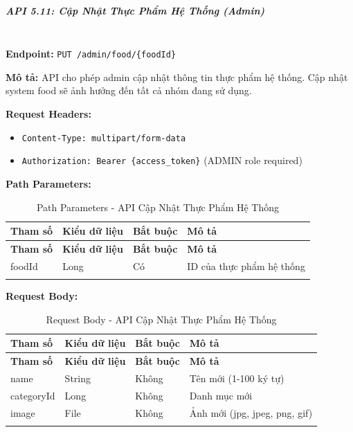 \normalsize

\subparagraph{API 5.11: Cập Nhật Thực Phẩm Hệ Thống (Admin)}~\\

\textbf{Endpoint:} \texttt{PUT /admin/food/\{foodId\}}

\textbf{Mô tả:} API cho phép admin cập nhật thông tin thực phẩm hệ thống. Cập nhật system food sẽ ảnh hưởng đến tất cả nhóm đang sử dụng.

\textbf{Request Headers:}
\begin{itemize}
    \item \texttt{Content-Type: multipart/form-data}
    \item \texttt{Authorization: Bearer \{access\_token\}} (ADMIN role required)
\end{itemize}

\textbf{Path Parameters:}

\small
\begin{longtable}{|>{\raggedright\arraybackslash}p{3.5cm}|>{\raggedright\arraybackslash}p{2.5cm}|>{\raggedright\arraybackslash}p{2cm}|>{\raggedright\arraybackslash}p{5.5cm}|}
\hline
\textbf{Tham số} & \textbf{Kiểu dữ liệu} & \textbf{Bắt buộc} & \textbf{Mô tả} \\
\hline
\endfirsthead
\hline
\textbf{Tham số} & \textbf{Kiểu dữ liệu} & \textbf{Bắt buộc} & \textbf{Mô tả} \\
\hline
\endhead
foodId & Long & Có & ID của thực phẩm hệ thống \\
\hline
\caption{Path Parameters - API Cập Nhật Thực Phẩm Hệ Thống}
\end{longtable}

\textbf{Request Body:}

\small
\begin{longtable}{|>{\raggedright\arraybackslash}p{3.5cm}|>{\raggedright\arraybackslash}p{2.5cm}|>{\raggedright\arraybackslash}p{2cm}|>{\raggedright\arraybackslash}p{5.5cm}|}
\hline
\textbf{Tham số} & \textbf{Kiểu dữ liệu} & \textbf{Bắt buộc} & \textbf{Mô tả} \\
\hline
\endfirsthead
\hline
\textbf{Tham số} & \textbf{Kiểu dữ liệu} & \textbf{Bắt buộc} & \textbf{Mô tả} \\
\hline
\endhead
name & String & Không & Tên mới (1-100 ký tự) \\
\hline
categoryId & Long & Không & Danh mục mới \\
\hline
image & File & Không & Ảnh mới (jpg, jpeg, png, gif) \\
\hline
\caption{Request Body - API Cập Nhật Thực Phẩm Hệ Thống}
\end{longtable}

